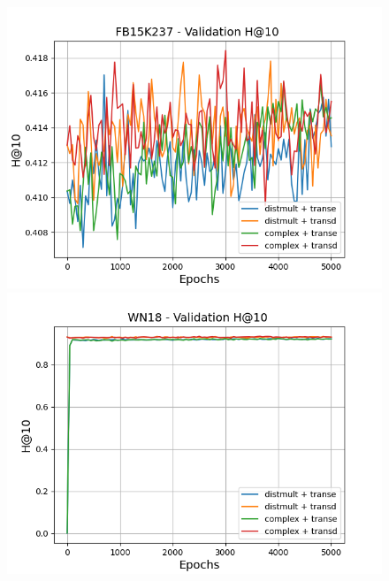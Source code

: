 \begin{figure}
    \begin{minipage}{.3\textwidth}
      \centering
      \includegraphics[width=\linewidth]{figures/results/gan_train/pretrained/uncertainty/max_distribution/entropy/fb15k237/gan_train_uncertainty_fb15k237_hit10s.png}
    \end{minipage}%
     \begin{minipage}{.3\textwidth}
      \centering
      \includegraphics[width=0.9\linewidth]{figures/results/gan_train/pretrained/uncertainty/max_distribution/entropy/wn18/gan_train_uncertainty_wn18_hit10s.png}
    \end{minipage}%
     \begin{minipage}{.3\textwidth}
      \centering

\end{minipage}
\end{figure}
